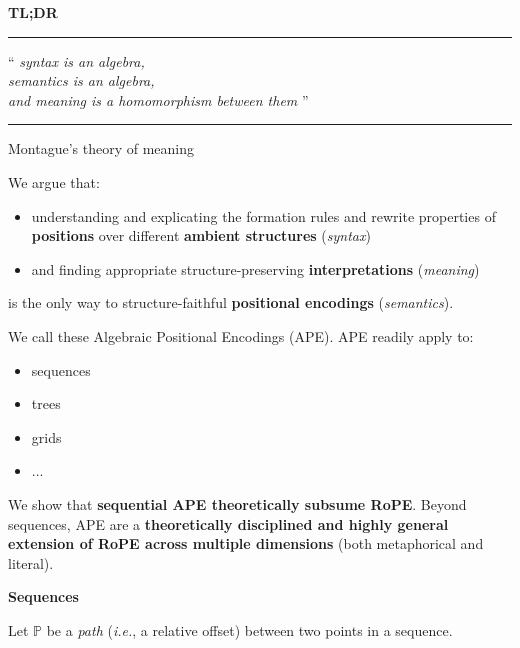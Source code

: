 \documentclass{article}
\newcommand{\sectionfont}{\fontsize{34}{34}\selectfont\setlength{\parskip}{1\baselineskip}}
\newcommand{\nfont}{\fontsize{21}{22}\selectfont\setlength{\parskip}{1\baselineskip}}
\newcommand{\light}[1]{\textcolor{gray!90}{#1}}
\newcommand{\Path}{\ensuremath{\mathbb{P}}}
\newcommand{\ape}{{APE}}
\newcommand{\rope}{{RoPE}}
\newcommand{\ie}{\textit{i.e.},}
\begin{document}
	\begin{minipage}[t]{0.3\textwidth}
		\sectionfont
		\textbf{TL;DR}
		
		\nfont	
		\hfill\rule[0\baselineskip]{0.65\textwidth}{1pt}
		
		\hfill\begin{minipage}{0.65\textwidth}
		``\textit{%
					syntax is an algebra,\\
					semantics is an algebra,\\
					and meaning is a homomorphism between them%
				}''\\
		\end{minipage}
		\vspace{-\baselineskip}
		\hfill\rule{.65\textwidth}{1pt}
		
		\hfill Montague's theory of meaning
		
		We argue that:
		\begin{itemize}[topsep=-1\baselineskip,noitemsep]
			\item understanding and explicating the formation rules and rewrite properties of \textbf{positions} over different \textbf{ambient structures} (\textit{syntax})
			\item and finding appropriate structure-preserving \textbf{interpretations} (\textit{meaning})
		\end{itemize}
		is the only way to structure-faithful \textbf{positional encodings} (\textit{semantics}).
		
		We call these Algebraic Positional Encodings (\ape). APE readily apply to:
		\begin{itemize}[topsep=-1\baselineskip,noitemsep]
			\item sequences
			\item trees
			\item grids
			\item ...
		\end{itemize}\vspace{\baselineskip}

		We show that \textbf{sequential \ape{} theoretically subsume \rope}. 	Beyond se\nolinebreak{}quences, \ape{} are a \textbf{theoretically disciplined and highly general extension of \rope{} across multiple dimensions} \light{(both metaphorical and literal)}.
		
		\sectionfont
		\vspace{\parskip}
		\textbf{Sequences}
		
		\nfont
		Let $\Path$ be a \textit{path} (\ie{} a relative offset) between two points in a sequence.
		

\end{minipage}
\end{document}
